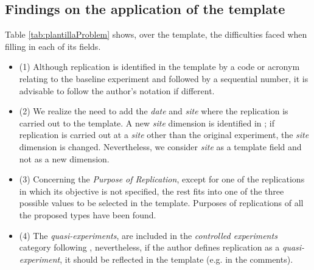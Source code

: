 \subsection{Findings on the application of the template}
\label{sec:findings}
Table \ref{tab:plantillaProblem} shows, over the template, the difficulties faced when filling in each of its fields.
%

%
\begin{itemize}

\item (1) Although replication is identified in the template by a code or acronym relating to the baseline experiment and followed by a sequential number, it is advisable to follow the author's notation if different.
\item (2) We realize the need to add the \emph{date} and \emph{site} where the replication is carried out to the template. A new \emph{site} dimension is identified in \cite{Juristo2012}; if replication is carried out at a \emph{site} other than the original experiment, the \emph{site} dimension is changed. Nevertheless, we consider \emph{site} as a template field and not as a new dimension.  
 

\item (3) Concerning the \emph{Purpose of Replication}, except for one of the replications in which its objective is not specified, the rest fits into one of the three possible values to be selected in the template. Purposes of replications of all the proposed types have been found.

\item (4) The \textit{quasi-experiments}, are included in the \textit{controlled experiments} category following \cite{wohlin:experimentation}, nevertheless, if the author defines replication as a \textit{quasi-experiment}, it should be reflected in the template (e.g. in the comments).

\end{itemize}

